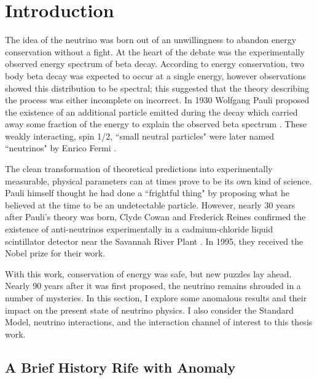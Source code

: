 \section{Introduction}
The idea of the neutrino was born out of an unwillingness to abandon energy conservation without a fight. At the heart of the debate was the experimentally observed energy spectrum of beta decay. According to energy conservation, two body beta decay was expected to occur at a single energy, however observations showed this distribution to be spectral; this suggested that the theory describing the process was either incomplete on incorrect.  In 1930 Wolfgang Pauli proposed the existence of an additional particle emitted during the decay which carried away some fraction of the energy to explain the observed beta spectrum \cite{bib:pauli}. These weakly interacting, spin 1/2, ``small neutral particles" were later named ``neutrinos" by Enrico Fermi \cite{bib:fermi}. 
\par The clean transformation of theoretical predictions into experimentally measurable, physical parameters can at times prove to be its own kind of science. Pauli himself thought he had done a ``frightful thing" by proposing what he believed at the time to be an undetectable particle. However, nearly 30 years after Pauli's theory was born, Clyde Cowan and Frederick Reines confirmed the existence of anti-neutrinos experimentally in a cadmium-chloride liquid scintillator detector near the Savannah River Plant \cite{bib:cowan}. In 1995, they received the Nobel prize for their work.
\par With this work, conservation of energy was safe, but new puzzles lay ahead. Nearly 90 years after it was first proposed, the neutrino remains shrouded in a number of mysteries. In this section, I explore some anomalous results and their impact on the present state of neutrino physics.  I also consider the Standard Model, neutrino interactions, and the interaction channel of interest to this thesis work. 

\subsection{A Brief History Rife with Anomaly}
